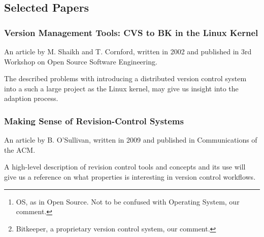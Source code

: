 \documentclass{article}
\begin{document}
\subsection{Selected Papers}
\subsubsection{Version Management Tools: CVS to BK in the Linux Kernel}

An article by M. Shaikh and T. Cornford, written in 2002 and published 
in 3rd Workshop on Open Source Software Engineering\cite{shaikh02}.

\begin{abstract}
 Version management tools might be seen as a prerequisite for open
 source development today as projects become too large to be managed by
 maintainers alone. Yet the OS\footnote{ 
  OS, as in Open Source. Not to be confused with Operating System, our 
  comment.
 } process depends on fluid coordination and collaboration with the
 underlying qualities of this process based on firm trust and
 respect for fellow developers. This paper is a study of how
 debate over version tools reflects governance and decision making
 in an OS community. The paper is based on a study of the Linux kernel
 community as it first saw a partial acceptance of the CVS tool, and then
 later adopted BK\footnote{
  Bitkeeper, a proprietary version control system, our comment. 
 }. The paper explains the adoption process in relation to governance
 concerns, license issues, and questions of technical performance.
\end{abstract}

The described problems with introducing a distributed version control
system into a such a large project as the Linux kernel, may give us 
insight into the adaption process.

\subsubsection{Making Sense of Revision-Control Systems}

An article by B. O'Sullivan, written in 2009 and published in
Communications of the ACM\cite{osullivan09}.

\begin{abstract}
 All revision-control systems come with complicated sets of trade-offs. How
 do you find the best match between tool and team?
\end{abstract}

A high-level description of revision control tools and concepts and its use
will give us a reference on what properties is interesting in version
control workflows.
\end{document}
